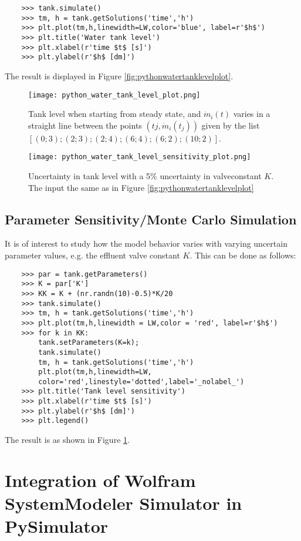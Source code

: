 \begin{lstlisting}
	>>> tank.simulate()
	>>> tm, h = tank.getSolutions('time','h')
	>>> plt.plot(tm,h,linewidth=LW,color='blue', label=r'$h$')
	>>> plt.title('Water tank level')
	>>> plt.xlabel(r'time $t$ [s]')
	>>> plt.ylabel(r'$h$ [dm]')
\end{lstlisting}

The result is displayed in Figure \ref{fig:pythonwatertanklevelplot}.

\begin{figure}
	\texttt{[image: python\_water\_tank\_level\_plot.png]}
	\caption{Tank level when starting from steady state, and $\dot{m}_i(t)$ varies in a straight line between the points $(tj,\dot{m}_i(t_j ))$
		given by the list $[(0; 3); (2; 3); (2; 4); (6; 4); (6; 2); (10; 2)]$.}
	\label{fig:pythonwatertanklevelplot}
	\texttt{[image: python\_water\_tank\_level\_sensitivity\_plot.png]}
	\caption{Uncertainty in tank level with a 5\% uncertainty in valveconstant $K$. The input the same as in Figure \ref{fig:pythonwatertanklevelplot}}
	\label{fig:pythonwatertanklevelsensitivityplot}
\end{figure}

\subsection{Parameter Sensitivity/Monte Carlo Simulation}
\label{subsec:pythonparametersensitivity}

It is of interest to study how the model behavior varies with varying uncertain parameter values, e.g. the effluent
valve constant $K$. This can be done as follows:

\begin{lstlisting}
	>>> par = tank.getParameters()
	>>> K = par['K']
	>>> KK = K + (nr.randn(10)-0.5)*K/20
	>>> tank.simulate()
	>>> tm, h = tank.getSolutions('time','h')
	>>> plt.plot(tm,h,linewidth = LW,color = 'red', label=r'$h$')
	>>> for k in KK:
		tank.setParameters(K=k);
		tank.simulate()
		tm, h = tank.getSolutions('time','h')
		plt.plot(tm,h,linewidth=LW,
		color='red',linestyle='dotted',label='_nolabel_')
	>>> plt.title('Tank level sensitivity')
	>>> plt.xlabel(r'time $t$ [s]')
	>>> plt.ylabel(r'$h$ [dm]')
	>>> plt.legend()
\end{lstlisting}

The result is as shown in Figure \ref{fig:pythonwatertanklevelsensitivityplot}.

\section{Integration of Wolfram SystemModeler Simulator in PySimulator}
\label{sec:pythonwolframplugin}

